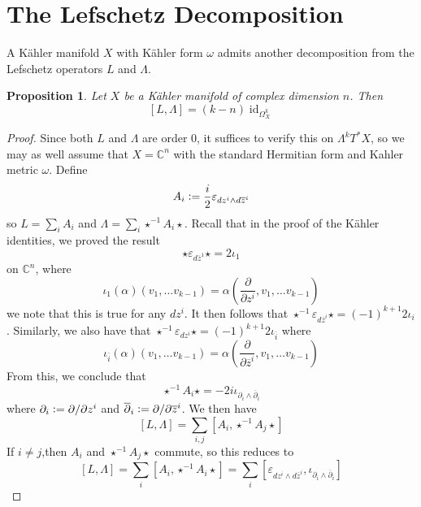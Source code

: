 \documentclass[psamsfonts, 12pt]{amsart}
\newtheorem{prop}[thm]{Proposition}
\theoremstyle{definition}
\theoremstyle{remark}
\newcommand{\C}{\mathbb{C}}
\newcommand{\dbar}{\overline{\partial}}
\newcommand{\zbar}{\overline{z}}
\newcommand{\inv}{^{-1}}
\newcommand{\defeq}{\vcentcolon=}
\DeclareMathOperator{\id}{id}
\begin{document}
\section{The Lefschetz Decomposition}
%
A K\"ahler manifold $X$ with K\"ahler form $\omega$ admits another decomposition
from the Lefschetz operators $L$ and $\Lambda$.
%
\begin{prop}
Let $X$ be a K\"ahler manifold of complex dimension $n$. Then
\[
[L,\Lambda] = (k-n)\id_{\Omega^k_X}
\]
\end{prop}
%
\begin{proof}
Since both $L$ and $\Lambda$ are order $0$, it suffices to verify this on
$\Lambda^kT^*X$, so we may as well assume that $X = \C^n$ with the standard Hermitian
form and Kahler metric $\omega$. Define
\[
A_i \defeq \frac{i}{2}\varepsilon_{dz^i\wedge d\zbar^i}
\]
so $L = \sum_i A_i$ and $\Lambda = \sum_i\star\inv A_i\star$. Recall that in the proof
of the K\"ahler identities, we proved the result
\[
\star\varepsilon_{d\zbar^1}\star = 2\iota_1
\]
on $\C^n$, where
\[
\iota_1(\alpha)(v_1,\ldots v_{k-1})
= \alpha\left(\frac{\partial}{\partial z^i}, v_1, \ldots v_{k-1} \right)
\]
we note that this is true for any $dz^i$. It then follows that
$\star\inv\varepsilon_{d\zbar^i}\star = (-1)^{k+1}2\iota_i$. Similarly, we also have
that $\star\inv\varepsilon_{dz^i}\star = (-1)^{k+1}2\iota_{\bar{i}}$ where
\[
\iota_{\bar{i}}(\alpha)(v_1,\ldots v_{k-1})
= \alpha\left(\frac{\partial}{\partial \zbar^i}, v_1, \ldots v_{k-1} \right)
\]
From this, we conclude that
\[
\star\inv A_i\star = -2i\iota_{\partial_i \wedge \dbar_i}
\]
where $\partial_i \defeq \partial/\partial z^i$ and
$\dbar_i \defeq \partial/\partial\zbar^i$. We then have
\[
[L,\Lambda] = \sum_{i,j} [A_i,\star\inv A_j\star]
\]
If $i \neq j$,then $A_i$ and $\star\inv A_j\star$ commute, so this reduces to
\[
[L,\Lambda]= \sum_i [A_i, \star\inv A_i\star] =
\sum_i [\varepsilon_{dz^i\wedge d\zbar^i}, \iota_{\partial_i \wedge \dbar_i}]
\]
\end{proof}
%
\end{document}
